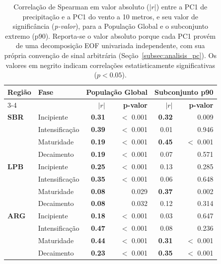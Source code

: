 \begin{table}[htbp]
\centering
\caption[Coerência entre os modos de precipitação e vento a 10m (Global e p90)]{Correlação de Spearman em valor absoluto ($|r|$) entre a PC1 de precipitação e a PC1 do vento a 10 metros, e seu valor de significância (\textit{p-valor}), para a População Global e o subconjunto extremo (p90). Reporta-se o valor absoluto porque cada PC1 provém de uma decomposição EOF univariada independente, com sua própria convenção de sinal arbitrária (Seção~\ref{subsec:analisis_pc}). Os valores em negrito indicam correlações estatisticamente significativas ($p < 0.05$).}
\label{tab:meof_coherencia}
\begin{tabular*}{\textwidth}{@{\extracolsep{\fill}}llrrrr}
\hline
\textbf{Região} & \textbf{Fase} & \multicolumn{2}{c}{\textbf{População Global}} & \multicolumn{2}{c}{\textbf{Subconjunto p90}} \\
\cline{3-4} \cline{5-6}
 & & \textbf{$|r|$} & \textbf{p-valor} & \textbf{$|r|$} & \textbf{p-valor} \\
\hline
\textbf{SBR} & Incipiente & \textbf{0.31} & $<$ 0.001 & \textbf{0.32} & 0.009 \\
 & Intensificação & \textbf{0.39} & $<$ 0.001 & 0.01 & 0.946 \\
 & Maturidade & \textbf{0.19} & $<$ 0.001 & \textbf{0.45} & $<$ 0.001 \\
 & Decaimento & \textbf{0.19} & $<$ 0.001 & 0.07 & 0.571 \\
\hline
\textbf{LPB} & Incipiente & \textbf{0.25} & $<$ 0.001 & 0.13 & 0.285 \\
 & Intensificação & \textbf{0.35} & $<$ 0.001 & 0.06 & 0.648 \\
 & Maturidade & \textbf{0.08} & 0.029 & \textbf{0.37} & 0.002 \\
 & Decaimento & \textbf{0.08} & 0.032 & 0.12 & 0.314 \\
\hline
\textbf{ARG} & Incipiente & \textbf{0.18} & $<$ 0.001 & 0.03 & 0.647 \\
 & Intensificação & \textbf{0.47} & $<$ 0.001 & 0.08 & 0.236 \\
 & Maturidade & \textbf{0.44} & $<$ 0.001 & \textbf{0.31} & $<$ 0.001 \\
 & Decaimento & \textbf{0.23} & $<$ 0.001 & \textbf{0.35} & $<$ 0.001 \\
\hline
\end{tabular*}
\end{table}
